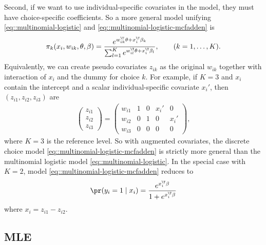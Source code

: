 Second, if we want to use individual-specific covariates in the model, they must have choice-specific coefficients. So a more general model unifying \eqref{eq::multinomial-logistic} and \eqref{eq::multinomial-logistic-mcfadden} is
\begin{eqnarray}
\pi_{k}(x_{i}, w_{ik}, \theta, \beta)=\frac{e^{  w_{ik}^{\T}\theta + x_i^{\T} \beta_k }  }{\sum_{ l =1}^{K}e^{ w_{i l }^{\T}\theta + x_i^{\T} \beta_{ l } }},\qquad(k=1,\ldots,K) .
\label{eq::multinomial-logistic-unify}
\end{eqnarray}
Equivalently, we can create pseudo covariates $z_{ik}$ as the original $w_{ik}$ together with interaction of $x_i$ and the dummy for choice $k$. For example, if $K = 3$ and $x_i$ contain the intercept and a scalar individual-specific covariate $x_i'$, then $(z_{i1}, z_{i2}, z_{i3})$ are
\begin{eqnarray*}
\begin{pmatrix}
z_{i1} \\
z_{i2} \\
z_{i3}
\end{pmatrix}
= 
\begin{pmatrix}
w_{i1} & 1 & 0 & x_i' & 0 \\
w_{i2} & 0 & 1 & 0 & x_i' \\
w_{i3} & 0 & 0 & 0 & 0
\end{pmatrix},
\end{eqnarray*}
where $K=3$ is the reference level. 
So with augmented covariates, the discrete choice model \eqref{eq::multinomial-logistic-mcfadden} is strictly more general than the multinomial logistic model \eqref{eq::multinomial-logistic}. In the special case with $K=2$, model \eqref{eq::multinomial-logistic-mcfadden} reduces to
$$
\pr(y_i = 1\mid   x_i ) = \frac{  e^{  x_i^{\T} \beta }   }{   1 + e^{  x_i^{\T} \beta }  }
$$
where $x_i = z_{i1} - z_{i2}$. 




\subsection{MLE}

